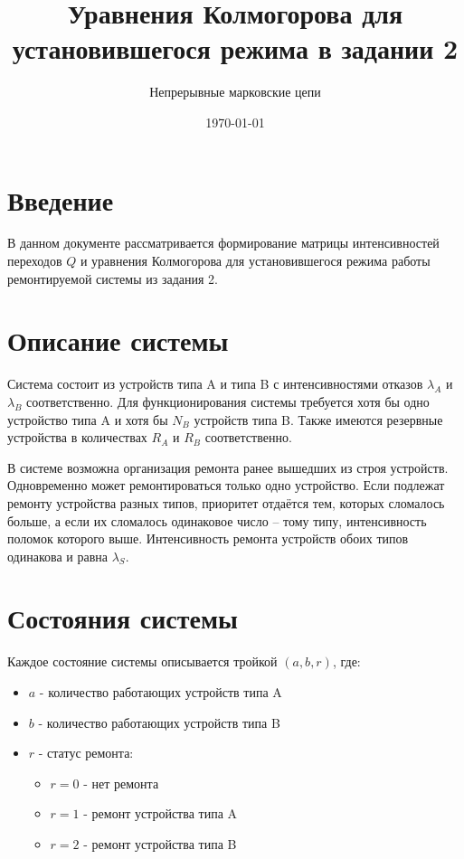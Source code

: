 \documentclass[12pt,a4paper]{article}
\title{Уравнения Колмогорова для установившегося режима в задании 2}
\author{Непрерывные марковские цепи}
\date{\today}
\begin{document}
\maketitle

\section{Введение}

В данном документе рассматривается формирование матрицы интенсивностей переходов $Q$ и уравнения Колмогорова для установившегося режима работы ремонтируемой системы из задания 2.

\section{Описание системы}

Система состоит из устройств типа A и типа B с интенсивностями отказов $\lambda_A$ и $\lambda_B$ соответственно. Для функционирования системы требуется хотя бы одно устройство типа A и хотя бы $N_B$ устройств типа B. Также имеются резервные устройства в количествах $R_A$ и $R_B$ соответственно.

В системе возможна организация ремонта ранее вышедших из строя устройств. Одновременно может ремонтироваться только одно устройство. Если подлежат ремонту устройства разных типов, приоритет отдаётся тем, которых сломалось больше, а если их сломалось одинаковое число – тому типу, интенсивность поломок которого выше. Интенсивность ремонта устройств обоих типов одинакова и равна $\lambda_S$.

\section{Состояния системы}

Каждое состояние системы описывается тройкой $(a, b, r)$, где:
\begin{itemize}
    \item $a$ - количество работающих устройств типа A
    \item $b$ - количество работающих устройств типа B
    \item $r$ - статус ремонта:
    \begin{itemize}
        \item $r = 0$ - нет ремонта
        \item $r = 1$ - ремонт устройства типа A
        \item $r = 2$ - ремонт устройства типа B
    \end{itemize}
\end{itemize}
\end{document}
